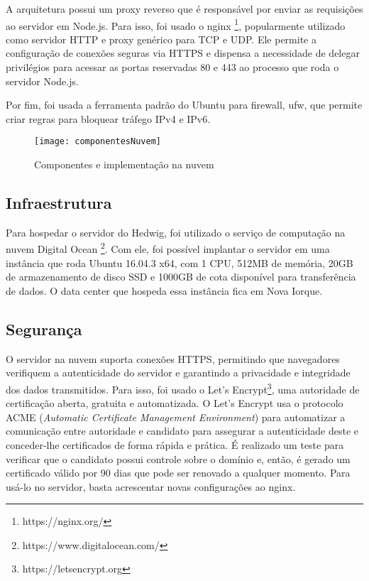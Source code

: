 A arquitetura possui um proxy reverso que é responsável por enviar as requisições ao servidor em Node.js. Para isso, foi usado o nginx \footnote{https://nginx.org/}, popularmente utilizado como servidor HTTP e proxy genérico para TCP e UDP. Ele permite a configuração de conexões seguras via HTTPS e dispensa a necessidade de delegar privilégios para acessar as portas reservadas 80 e 443 ao processo que roda o servidor Node.js.

Por fim, foi usada a ferramenta padrão do Ubuntu para firewall, ufw, que permite criar regras para bloquear tráfego IPv4 e IPv6.

\begin{figure}[H]
	\centering
	\caption{Componentes e implementação na nuvem}
  \texttt{[image: componentesNuvem]}
\label{fig:componentesNuvem}
\end{figure}

\subsection{Infraestrutura}

Para hospedar o servidor do Hedwig, foi utilizado o serviço de computação na nuvem Digital Ocean \footnote{https://www.digitalocean.com/}. Com ele, foi possível implantar o servidor em uma instância que roda Ubuntu 16.04.3 x64, com 1 CPU, 512MB de memória, 20GB de armazenamento de disco SSD e 1000GB de cota disponível para transferência de dados. O data center que hospeda essa instância fica em Nova Iorque.

\subsection{Segurança}

O servidor na nuvem suporta conexões HTTPS, permitindo que navegadores verifiquem a autenticidade do servidor e garantindo a privacidade e integridade dos dados transmitidos. Para isso, foi usado o Let's Encrypt\footnote{https://letsencrypt.org}, uma autoridade de certificação aberta, gratuita e automatizada. O Let's Encrypt usa o protocolo ACME (\emph{Automatic Certificate Management Environment}) para automatizar a comunicação entre autoridade e candidato para assegurar a autenticidade deste e conceder-lhe certificados de forma rápida e prática. É realizado um teste para verificar que o candidato possui controle sobre o domínio e, então, é gerado um certificado válido por 90 dias que pode ser renovado a qualquer momento. Para usá-lo no servidor, basta acrescentar novas configurações ao nginx.


